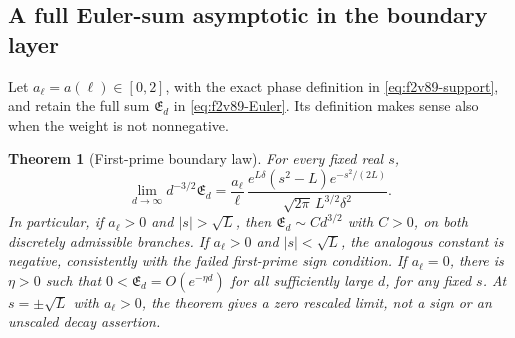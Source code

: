 \documentclass[11pt]{article}
\newtheorem{theorem}{Theorem}[section]
\theoremstyle{definition}
\theoremstyle{remark}
\begin{document}
\subsection{A full Euler-sum asymptotic in the boundary layer}

Let \(a_\ell=a(\ell)\in[0,2]\), with the exact phase definition
in \eqref{eq:f2v89-support}, and retain the full sum
\(\mathfrak E_d\) in \eqref{eq:f2v89-Euler}.  Its definition
makes sense also when the weight is not nonnegative.

\begin{theorem}[First-prime boundary law]
\label{thm:f2v90-Euler}
For every fixed real \(s\),
\begin{equation}
 \lim_{d\to\infty}d^{-3/2}\mathfrak E_d
 =\frac{a_\ell}{\ell}\,
 \frac{e^{L\delta}(s^2-L)e^{-s^2/(2L)}}
      {\sqrt{2\pi}\,L^{3/2}\delta^2}.
 \label{eq:f2v90-Euler-limit}
\end{equation}
In particular, if \(a_\ell>0\) and \(|s|>\sqrt L\), then
\(\mathfrak E_d\sim C d^{3/2}\) with \(C>0\), on both
discretely admissible branches.  If \(a_\ell>0\) and
\(|s|<\sqrt L\), the analogous constant is negative, consistently
with the failed first-prime sign condition.  If \(a_\ell=0\),
there is \(\eta>0\) such that
\(0<\mathfrak E_d=O(e^{-\eta d})\) for all sufficiently large
\(d\), for any fixed \(s\).  At \(s=\pm\sqrt L\) with
\(a_\ell>0\), the theorem gives a zero rescaled limit, not a sign
or an unscaled decay assertion.
\end{theorem}
\end{document}
